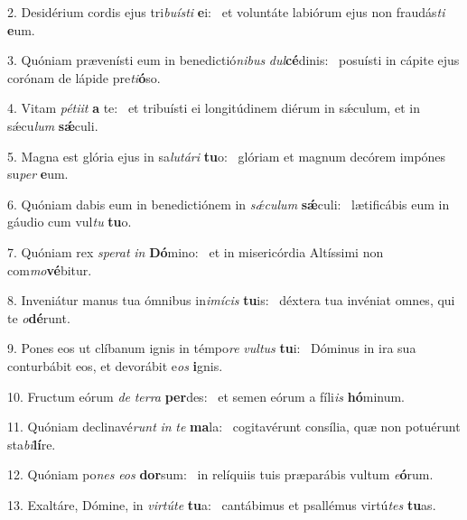 2. Desidérium cordis ejus tri\textit{bu}\textit{ís}\textit{ti} \textbf{e}i: \ast\  et voluntáte labiórum ejus non fraudás\textit{ti} \textbf{e}um.\

3. Quóniam prævenísti eum in benedictió\textit{ni}\textit{bus} \textit{dul}\textbf{cé}dinis: \ast\  posuísti in cápite ejus corónam de lápide pre\textit{ti}\textbf{ó}so.\

4. Vitam \textit{pé}\textit{ti}\textit{it} \textbf{a} te: \ast\  et tribuísti ei longitúdinem diérum in sǽculum, et in sǽcu\textit{lum} \textbf{sǽ}culi.\

5. Magna est glória ejus in sa\textit{lu}\textit{tá}\textit{ri} \textbf{tu}o: \ast\  glóriam et magnum decórem impónes su\textit{per} \textbf{e}um.\

6. Quóniam dabis eum in benedictiónem in \textit{sǽ}\textit{cu}\textit{lum} \textbf{sǽ}culi: \ast\  lætificábis eum in gáudio cum vul\textit{tu} \textbf{tu}o.\

7. Quóniam rex \textit{spe}\textit{rat} \textit{in} \textbf{Dó}mino: \ast\  et in misericórdia Altíssimi non com\textit{mo}\textbf{vé}bitur.\

8. Inveniátur manus tua ómnibus in\textit{i}\textit{mí}\textit{cis} \textbf{tu}is: \ast\  déxtera tua invéniat omnes, qui te \textit{o}\textbf{dé}runt.\

9. Pones eos ut clíbanum ignis in témpo\textit{re} \textit{vul}\textit{tus} \textbf{tu}i: \ast\  Dóminus in ira sua conturbábit eos, et devorábit e\textit{os} \textbf{i}gnis.\

10. Fructum eórum \textit{de} \textit{ter}\textit{ra} \textbf{per}des: \ast\  et semen eórum a fíli\textit{is} \textbf{hó}minum.\

11. Quóniam declinavé\textit{runt} \textit{in} \textit{te} \textbf{ma}la: \ast\  cogitavérunt consília, quæ non potuérunt sta\textit{bi}\textbf{lí}re.\

12. Quóniam po\textit{nes} \textit{e}\textit{os} \textbf{dor}sum: \ast\  in relíquiis tuis præparábis vultum \textit{e}\textbf{ó}rum.\

13. Exaltáre, Dómine, in \textit{vir}\textit{tú}\textit{te} \textbf{tu}a: \ast\  cantábimus et psallémus virtú\textit{tes} \textbf{tu}as.\


